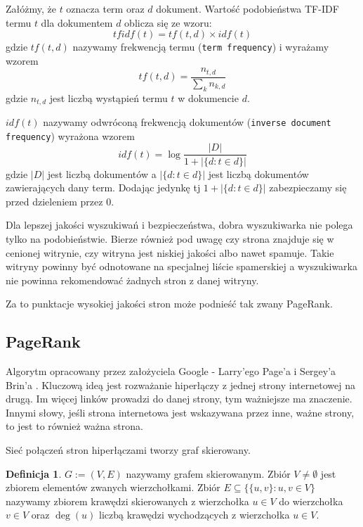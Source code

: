 \documentclass[licencjacka]{pracadypl}
\theoremstyle{definition}
\newtheorem{de}{Definicja}
\begin{document}
Załóżmy, że $t$ oznacza term oraz $d$ dokument.
Wartość podobieństwa TF-IDF termu $t$ dla dokumentem $d$ oblicza się ze wzoru:
\[
	tfidf(t) = tf(t,d) \times idf(t)
\]
gdzie $tf(t,d)$ nazywamy frekwencją termu (\texttt{term frequency}) i wyrażamy wzorem
\[
	tf(t,d) = 
	\frac{n_{t,d}}{\sum_{k} n_{k,d}}
\]
gdzie $n_{t,d}$ jest liczbą wystąpień termu $t$ w dokumencie $d$.

$idf(t)$ nazywamy odwróconą frekwencją dokumentów (\texttt{inverse document frequency}) wyrażona wzorem
\[
	idf(t) = \log 
	\frac 
	{ |D| }
	{ 1 + |\{ d \colon t \in d \}| }
\]
gdzie $|D|$ jest liczbą dokumentów a $|\{ d \colon t \in d \}|$ jest liczbą dokumentów zawierających dany term. Dodając jedynkę tj $1 + |\{ d \colon t \in d \}|$ zabezpieczamy się przed dzieleniem przez $0$. 


Dla lepszej jakości wyszukiwań i bezpieczeństwa,  dobra wyszukiwarka nie polega tylko na podobieństwie.
Bierze również pod uwagę czy strona znajduje się w cenionej witrynie, czy witryna jest niskiej jakości albo nawet spamuje. Takie witryny powinny być odnotowane na specjalnej liście spamerskiej a wyszukiwarka nie powinna rekomendować żadnych stron z danej witryny.

Za to punktacje wysokiej jakości stron może podnieść tak zwany PageRank.

\newpage
\subsection{PageRank}

Algorytm opracowany przez założyciela Google - Larry'ego Page'a i Sergey'a Brin'a \cite{google-how-search-works}. 
Kluczową ideą jest rozważanie hiperłączy z jednej strony internetowej na drugą.
Im więcej linków prowadzi do danej strony, tym ważniejsze ma znaczenie. 
Innymi słowy, jeśli strona internetowa jest wskazywana przez inne, ważne strony, to jest to również ważna strona.

Sieć połączeń stron hiperłączami tworzy graf skierowany.
\begin{de}
	$G := (V,E)$ nazywamy grafem skierowanym. 
	Zbiór $V \neq \emptyset$ jest zbiorem elementów zwanych wierzchołkami.
	Zbiór $E \subseteq 
	\big\{
		\{ u,v \} \colon u,v \in V
	 \big\}$
	 nazywamy zbiorem krawędzi skierowanych z wierzchołka $u \in V$ do wierzchołka $v \in V$
	 oraz $\deg(u)$ liczbą krawędzi wychodzących z wierzchołka $u \in V$.
\end{de}
\end{document}
